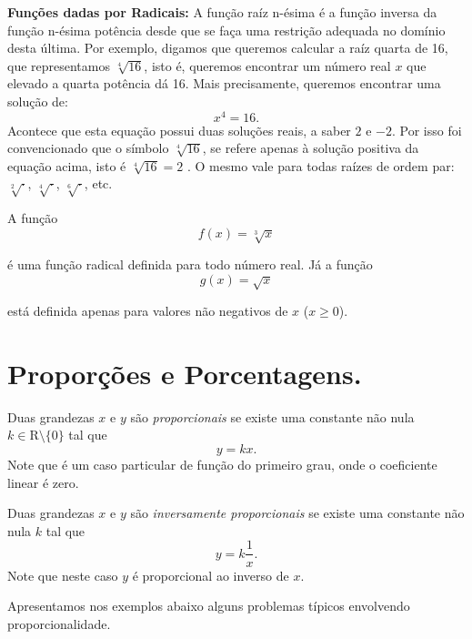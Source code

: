 \noindent\textbf{Funções dadas por Radicais:}  A função raíz n-ésima é a função inversa da função n-ésima potência desde que
se faça  uma restrição adequada no domínio desta última. Por exemplo, digamos que queremos calcular a raíz quarta de
16, que representamos $\sqrt[4]{16}$, isto é, queremos encontrar um número real $x$ que elevado a quarta potência
dá 16. Mais precisamente, queremos encontrar uma solução de:
$$x^4=16.$$
Acontece que esta equação possui duas soluções reais, a saber $2$ e $-2$. Por isso foi convencionado que o símbolo
$\sqrt[4]{16}$, se refere apenas à solução positiva da equação acima, isto é $\sqrt[4]{16}=2$ .
O mesmo vale para todas raízes de ordem par: $\sqrt[2]{\cdot }$, $\sqrt[4]{\cdot}$, $\sqrt[6]{\cdot}$, etc.
\begin{center}
\begin{minipage}{16cm}
\end{minipage}
\end{center}
\begin{exemplo} A função $$f(x)=\sqrt[3]{x}$$

é uma função radical definida para todo número real. Já a função $$g(x)= \sqrt{x}$$

está definida apenas para valores não negativos de $x$ ($x\geq 0$).
\end{exemplo}


\section{Proporções e Porcentagens.}

Duas grandezas $x$ e $y$ são \textit{proporcionais} se existe uma constante não nula $k\in \mbox{R}\setminus \{0\}$ tal que $$y=kx.$$ Note que é um caso particular de função do primeiro grau, onde o coeficiente linear é zero.

Duas grandezas $x$ e $y$ são \textit{inversamente proporcionais} se existe uma constante não nula $k$ tal que $$y=k\frac{1}{x}.$$ Note que neste caso $y$ é proporcional ao inverso de $x$.

\clearpage

Apresentamos nos exemplos abaixo alguns problemas típicos envolvendo proporcionalidade.

